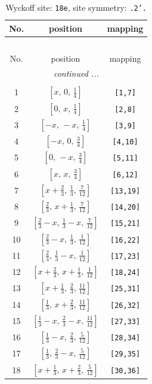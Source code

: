 \documentclass[fleqn,8pt]{jsarticle}
\begin{document}
\renewcommand{\arraystretch}{1.2}
\begin{longtable}{ccc}
\caption{Wyckoff site: {\tt 18e}, site symmetry: {\tt .2'.}}
 \\
 \hline \hline
No. & position & mapping \\ \hline \endfirsthead

\multicolumn{2}{l}{\tablename\ \thetable{}} \\
 \hline \hline
No. & position & mapping \\ \hline \endhead

 \hline \hline
\multicolumn{2}{r}{\footnotesize\it continued ...} \\ \endfoot

 \hline \hline
\multicolumn{2}{r}{} \\ \endlastfoot

1 & $\left[ x,\, 0,\, \frac{1}{4} \right]$ & {\tt [1,7]} \\ \hline
2 & $\left[ 0,\, x,\, \frac{1}{4} \right]$ & {\tt [2,8]} \\ \hline
3 & $\left[ - x,\, - x,\, \frac{1}{4} \right]$ & {\tt [3,9]} \\ \hline
4 & $\left[ - x,\, 0,\, \frac{3}{4} \right]$ & {\tt [4,10]} \\ \hline
5 & $\left[ 0,\, - x,\, \frac{3}{4} \right]$ & {\tt [5,11]} \\ \hline
6 & $\left[ x,\, x,\, \frac{3}{4} \right]$ & {\tt [6,12]} \\ \hline
7 & $\left[ x + \frac{2}{3},\, \frac{1}{3},\, \frac{7}{12} \right]$ & {\tt [13,19]} \\ \hline
8 & $\left[ \frac{2}{3},\, x + \frac{1}{3},\, \frac{7}{12} \right]$ & {\tt [14,20]} \\ \hline
9 & $\left[ \frac{2}{3} - x,\, \frac{1}{3} - x,\, \frac{7}{12} \right]$ & {\tt [15,21]} \\ \hline
10 & $\left[ \frac{2}{3} - x,\, \frac{1}{3},\, \frac{1}{12} \right]$ & {\tt [16,22]} \\ \hline
11 & $\left[ \frac{2}{3},\, \frac{1}{3} - x,\, \frac{1}{12} \right]$ & {\tt [17,23]} \\ \hline
12 & $\left[ x + \frac{2}{3},\, x + \frac{1}{3},\, \frac{1}{12} \right]$ & {\tt [18,24]} \\ \hline
13 & $\left[ x + \frac{1}{3},\, \frac{2}{3},\, \frac{11}{12} \right]$ & {\tt [25,31]} \\ \hline
14 & $\left[ \frac{1}{3},\, x + \frac{2}{3},\, \frac{11}{12} \right]$ & {\tt [26,32]} \\ \hline
15 & $\left[ \frac{1}{3} - x,\, \frac{2}{3} - x,\, \frac{11}{12} \right]$ & {\tt [27,33]} \\ \hline
16 & $\left[ \frac{1}{3} - x,\, \frac{2}{3},\, \frac{5}{12} \right]$ & {\tt [28,34]} \\ \hline
17 & $\left[ \frac{1}{3},\, \frac{2}{3} - x,\, \frac{5}{12} \right]$ & {\tt [29,35]} \\ \hline
18 & $\left[ x + \frac{1}{3},\, x + \frac{2}{3},\, \frac{5}{12} \right]$ & {\tt [30,36]} \\
\end{longtable}
\end{document}
